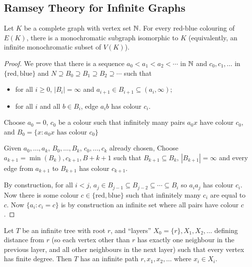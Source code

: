 \documentclass[main.tex]{subfiles}
\begin{document}
\subsection{Ramsey Theory for Infinite Graphs}
\begin{theorem}
  Let $K$ be a complete graph with vertex set $\mathbb N$.
  For every red-blue colouring of $E(K)$, there is a monochromatic subgraph
  isomorphic to $K$ (equivalently, an infinite monochromatic subset of $V(K)$).
\end{theorem}
\begin{proof}
  We prove that there is a sequence $a_0 < a_1 < a_2 < \cdots$ in $\mathbb N$ and
  $c_0,c_1,\ldots$ in $\{\text{red}, \text{blue}\}$ and
  $N\supseteq B_0\supseteq B_1\supseteq B_2\supseteq\cdots$ such that
  \begin{itemize}
    \item for all $i\geq 0$, $|B_i| = \infty$ and $a_{i+1}\in B_{i+1}\subseteq(a_i,\infty)$;
    \item for all $i$ and all $b\in B_i$, edge $a_ib$ has colour $c_i$.
  \end{itemize}
  Choose $a_0 = 0$, $c_0$ be a colour such that infinitely many pairs $a_0x$
  have colour $c_0$, and $B_0 = \{x : a_0x\text{ has colour }c_0\}$

  Given $a_0,\ldots,a_k$, $B_0,\ldots,B_k$, $c_0,\ldots,c_k$ already chosen,
  Choose $a_{k+1} = \min(B_k), c_{k+1}, B+{k+1}$ such that $B_{k+1}\subseteq B_k$,
  $|B_{k+1}| = \infty$ and every edge from $a_{k+1}$ to $B_{k+1}$ has colour $c_{k+1}$.

  By construction, for all $i < j$,
  $a_j\in B_{j-1}\subseteq B_{j-2}\subseteq\cdots\subseteq B_i$
  so $a_ia_j$ has colour $c_i$.
  Now there is some colour $c\in\{\text{red},\text{blue}\}$ such that infinitely
  many $c_i$ are equal to $c$.
  Now $\{a_i : c_i = c\}$ is by construction an infinite set where all pairs
  have colour $c$.
\end{proof}
\begin{theorem}
  Let $T$ be an infinite tree with root $r$, and ``layers''
  $X_0 = \{r\}, X_1, X_2, \ldots$ defining distance from $r$ (so each vertex
  other than $r$ has exactly one neighbour in the previous layer, and all other
  neighbours in the next layer) such that every vertex has finite degree.
  Then $T$ has an infinite path $r, x_1, x_2,\ldots$ where $x_i\in X_i$.
\end{theorem}
\end{document}
